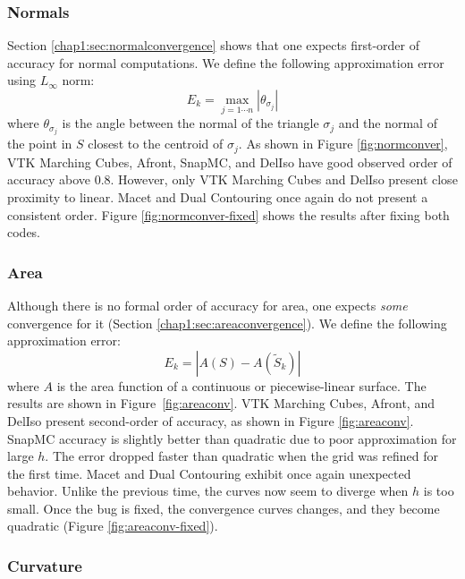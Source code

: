 \subsubsection{Normals}
\label{subchap1:sec:normal-convergence}

Section \ref{chap1:sec:normalconvergence} shows that 
one expects first-order of accuracy for normal computations. 
We define the following approximation error using $L_\infty$ norm:
\begin{equation}
E_{k} = \max_{j=1\cdots n}|\theta_{\sigma_j}|
\label{eq:normerror}
\end{equation}
where $\theta_{\sigma_j}$ is the angle between the normal of 
the triangle $\sigma_j$ and the normal of 
the point in $S$ closest to the centroid of $\sigma_j$.
As shown in Figure \ref{fig:normconver}, VTK Marching Cubes, Afront,
SnapMC, and DelIso have good observed order of accuracy above $0.8$. However, only 
VTK Marching Cubes and DelIso present close proximity to linear. 
Macet and Dual Contouring once again do not present a consistent order. 
Figure \ref{fig:normconver-fixed} shows the results after fixing both codes.

\subsubsection{Area}
\label{chap1:sec:area-observed-order-of-accuracy}

Although there is no formal order of accuracy for area, one expects \emph{some}
convergence for it (Section \ref{chap1:sec:areaconvergence}).
We define the following approximation error:
\begin{equation}
E_{k} = |A(S) - A(\tilde{S}_k)|
\label{eq:surfareaerror}
\end{equation}
where $A$ is the area function of a continuous or piecewise-linear surface. 
The results are shown in Figure~\ref{fig:areaconv}. 
VTK Marching Cubes, Afront, and DelIso present second-order of accuracy, as shown 
in Figure \ref{fig:areaconv}. SnapMC accuracy is slightly better than quadratic due 
to poor approximation for large $h$. The error dropped faster than quadratic when the 
grid was refined for the first time. Macet and Dual Contouring exhibit once again  
unexpected behavior. Unlike the previous time, the curves now seem to diverge 
when $h$ is too small. Once the bug is fixed, the convergence curves changes,
and they become quadratic (Figure \ref{fig:areaconv-fixed}).
 
\subsubsection{Curvature}

